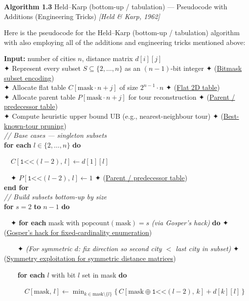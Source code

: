 \documentclass[11pt]{article}
\begin{document}
    \begin{pseudobox}

\textbf{Algorithm 1.3} Held--Karp (bottom-up / tabulation) ---
Pseudocode with Additions (Engineering Tricks) \emph{{[}Held \& Karp,
1962{]}}

\tcbline

Here is the pseudocode for the Held--Karp (bottom-up / tabulation)
algorithm with also employing all of the additions and engineering
tricks mentioned above:

\textbf{Input:} number of cities \(n\), distance matrix \(d[i][j]\)\\
✦ Represent every subset \(S\subseteq\{2,\ldots,n\}\) as an
\((n{-}1)\)-bit integer ✦ (\hyperref[trick-1-3-1]{Bitmask subset
encoding})\\
✦ Allocate flat table \(C[\text{mask}\cdot n + j]\) of size
\(2^{n-1}\!\cdot n\) ✦ (\hyperref[trick-1-3-3]{Flat 2D table})\\
✦ Allocate parent table \(P[\text{mask}\cdot n + j]\) for tour
reconstruction ✦ (\hyperref[trick-1-3-4]{Parent / predecessor table})\\
✦ Compute heuristic upper bound \(\mathrm{UB}\) (e.g., nearest-neighbour
tour) ✦ (\hyperref[trick-1-3-6]{Best-known-tour pruning})\\
\emph{// Base cases --- singleton subsets}\\
\textbf{for each} \(l \in \{2, \ldots, n\}\) \textbf{do}\\
\strut ~~\(C[\texttt{1<<}(l{-}2),\, l] \leftarrow d[1][l]\)\\
\strut ~~✦ \(P[\texttt{1<<}(l{-}2),\, l] \leftarrow 1\) ✦
(\hyperref[trick-1-3-4]{Parent / predecessor table})\\
\textbf{end for}\\
\emph{// Build subsets bottom-up by size}\\
\textbf{for} \(s = 2\) \textbf{to} \(n - 1\) \textbf{do}\\
\strut ~~✦ \textbf{for each} mask with
\(\mathrm{popcount}(\text{mask}) = s\) \emph{(via Gosper's hack)}
\textbf{do} ✦ (\hyperref[trick-1-3-2]{Gosper's hack for
fixed-cardinality enumeration})\\
\strut ~~~~✦ \emph{(For symmetric \(d\): fix direction so second city
\(<\) last city in subset)} ✦ (\hyperref[trick-1-3-5]{Symmetry
exploitation for symmetric distance matrices})\\
\strut ~~~~\textbf{for each} \(l\) with bit \(l\) set in mask
\textbf{do}\\
\strut ~~~~~~\(C[\text{mask},\, l] \leftarrow \min_{k \in \text{mask}\setminus\{l\}} \bigl\{\, C[\text{mask}\oplus\texttt{1<<}(l{-}2),\, k] + d[k][l] \,\bigr\}\)\\

\end{pseudobox}
\end{document}

